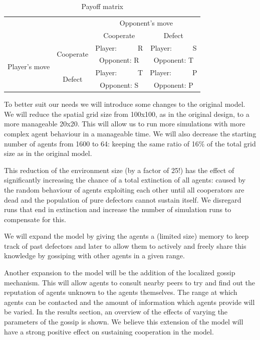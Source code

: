 \documentclass[english]{article}
\begin{document}
\begin{table}[h!]
  \centering
  \begin{tabular}{c c||c|c}
    & & \multicolumn{2}{c}{Opponent's move} \\
    & & Cooperate & Defect \\
    \hline\hline

    \multirow{4}{6em}{Player's move}
    & \multirow{2}{5em}{Cooperate}
      & Player:\ \ \ \ \ \ R & Player:\ \ \ \ \ \ S \\
    & & Opponent: R & Opponent: T \\
    \cline{2-4}
    & \multirow{2}{5em}{Defect}
      & Player:\ \ \ \ \ \ T & Player:\ \ \ \ \ \ P \\
    & & Opponent: S & Opponent: P \\
  \end{tabular}

  \caption{Payoff matrix}
  \label{table:payoff}
\end{table}

To better suit our needs we will introduce some changes to the original model.
We will reduce the spatial grid size from 100x100, as in the original design, to a more manageable 20x20.
This will allow us to run more simulations with more complex agent behaviour in a manageable time.
We will also decrease the starting number of agents from 1600 to 64: keeping the same ratio of 16\% of the total grid size as in the original model.

This reduction of the environment size (by a factor of 25!) has the effect of significantly increasing the chance of a total extinction of all agents:
caused by the random behaviour of agents exploiting each other until all cooperators are dead and the population of pure defectors cannot sustain itself.
We disregard runs that end in extinction and increase the number of simulation runs to compensate for this.

We will expand the model by giving the agents a (limited size) memory to keep track of past defectors and later to allow them to actively and freely share this knowledge by gossiping with other agents in a given range.

Another expansion to the model will be the addition of the localized gossip mechanism.
This will allow agents to consult nearby peers to try and find out the reputation of agents unknown to the agents themselves.
The range at which agents can be contacted and the amount of information which agents provide will be varied.
In the results section, an overview of the effects of varying the parameters of the gossip is shown.
We believe this extension of the model will have a strong positive effect on sustaining cooperation in the model.
\end{document}
